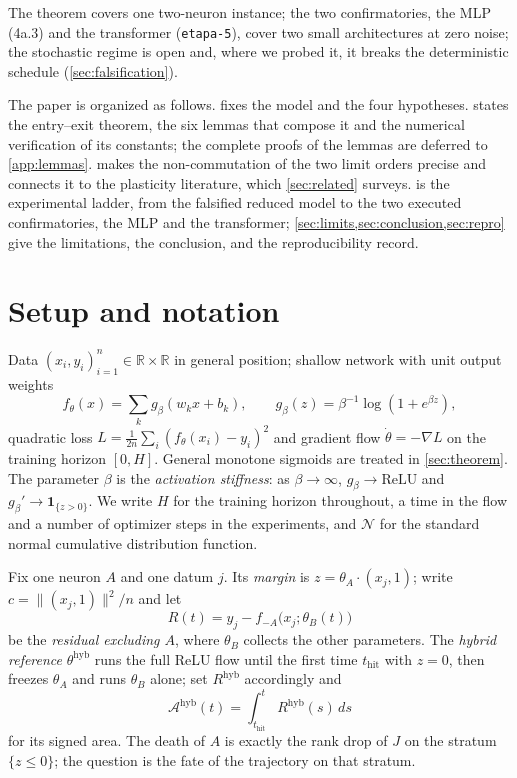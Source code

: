 \documentclass[11pt]{article}
\theoremstyle{definition}
\theoremstyle{remark}
\newcommand{\R}{\mathbb{R}}
\newcommand{\thit}{t_{\mathrm{hit}}}
\newcommand{\Ar}{\mathcal{A}}                      %
\newcommand{\hyb}{\mathrm{hyb}}
\begin{document}
The theorem covers one two-neuron instance; the two confirmatories, the MLP
(4a.3) and the transformer (\texttt{etapa-5}), cover two small architectures at
zero noise; the stochastic regime is open and, where we probed it, it breaks the
deterministic schedule (\cref{sec:falsification}).

The paper is organized as follows.  fixes the model and the four
hypotheses.  states the entry--exit theorem, the six lemmas
that compose it and the numerical verification of its constants; the complete
proofs of the lemmas are deferred to \cref{app:lemmas}.  makes
the non-commutation of the two limit orders precise and connects it to the
plasticity literature, which \cref{sec:related} surveys. 
is the experimental ladder, from the falsified reduced model to the two executed
confirmatories, the MLP and the transformer; \cref{sec:limits,sec:conclusion,sec:repro} give
the limitations, the conclusion, and the reproducibility record.

\section{Setup and notation}\label{sec:setup}

Data $(x_i,y_i)_{i=1}^n\in\R\times\R$ in general position; shallow network with
unit output weights
\begin{equation}\label{eq:net}
f_\theta(x)=\sum_{k} g_\beta(w_kx+b_k),
\qquad
g_\beta(z)=\beta^{-1}\log(1+e^{\beta z}),
\end{equation}
quadratic loss $L=\tfrac1{2n}\sum_i(f_\theta(x_i)-y_i)^2$ and gradient flow
$\dot\theta=-\nabla L$ on the training horizon $[0,H]$. General monotone sigmoids
are treated in \cref{sec:theorem}. The parameter $\beta$ is the
\emph{activation stiffness}: as $\beta\to\infty$, $g_\beta\to\mathrm{ReLU}$ and
$g_\beta'\to\mathbf 1_{\{z>0\}}$. We write $H$ for the training horizon
throughout, a time in the flow and a number of optimizer steps in the
experiments, and $\mathcal N$ for the standard normal cumulative distribution
function.

Fix one neuron $A$ and one datum $j$. Its \emph{margin} is
$z=\theta_A\cdot(x_j,1)$; write $c=\|(x_j,1)\|^2/n$ and let
\begin{equation}\label{eq:residual}
R(t)=y_j-f_{-A}\bigl(x_j;\theta_B(t)\bigr)
\end{equation}
be the \emph{residual excluding $A$}, where $\theta_B$ collects the other
parameters. The \emph{hybrid reference} $\theta^{\hyb}$ runs the full ReLU flow
until the first time $\thit$ with $z=0$, then freezes $\theta_A$ and runs
$\theta_B$ alone; set $R^{\hyb}$ accordingly and
\begin{equation}\label{eq:area}
\Ar^{\hyb}(t)=\int_{\thit}^{t}R^{\hyb}(s)\,ds
\end{equation}
for its signed area. The death of $A$ is exactly the rank drop of $J$ on the
stratum $\{z\le0\}$; the question is the fate of the trajectory on that stratum.
\end{document}
